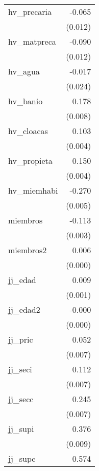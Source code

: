 {\begin{longtable}{l*{1}{D{.}{.}{-1}}}
\addlinespace
hv\_precaria &      -0.065\sym{***}\\
            &     (0.012)         \\
\addlinespace
hv\_matpreca &      -0.090\sym{***}\\
            &     (0.012)         \\
\addlinespace
hv\_agua     &      -0.017         \\
            &     (0.024)         \\
\addlinespace
hv\_banio    &       0.178\sym{***}\\
            &     (0.008)         \\
\addlinespace
hv\_cloacas  &       0.103\sym{***}\\
            &     (0.004)         \\
\addlinespace
hv\_propieta &       0.150\sym{***}\\
            &     (0.004)         \\
\addlinespace
hv\_miemhabi &      -0.270\sym{***}\\
            &     (0.005)         \\
\addlinespace
miembros    &      -0.113\sym{***}\\
            &     (0.003)         \\
\addlinespace
miembros2   &       0.006\sym{***}\\
            &     (0.000)         \\
\addlinespace
jj\_edad     &       0.009\sym{***}\\
            &     (0.001)         \\
\addlinespace
jj\_edad2    &      -0.000\sym{***}\\
            &     (0.000)         \\
\addlinespace
jj\_pric     &       0.052\sym{***}\\
            &     (0.007)         \\
\addlinespace
jj\_seci     &       0.112\sym{***}\\
            &     (0.007)         \\
\addlinespace
jj\_secc     &       0.245\sym{***}\\
            &     (0.007)         \\
\addlinespace
jj\_supi     &       0.376\sym{***}\\
            &     (0.009)         \\
\addlinespace
jj\_supc     &       0.574\sym{***}\\

\end{longtable}}
